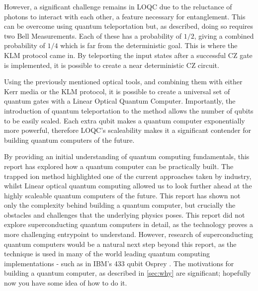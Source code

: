 However, a significant challenge remains in LOQC due to the reluctance of photons to interact with each other, a feature necessary for entanglement. This can be overcome using quantum teleportation but, as described, doing so requires two Bell Measurements. Each of these has a probability of $1/2$, giving a combined probability of $1/4$ which is far from the deterministic goal. This is where the KLM protocol came in. By teleporting the input states after a successful CZ gate is implemented, it is possible to create a near deterministic CZ circuit.

Using the previously mentioned optical tools, and combining them with either Kerr media or the KLM protocol, it is possible to create a universal set of quantum gates with a Linear Optical Quantum Computer. Importantly, the introduction of quantum teleportation to the method allows the number of qubits to be easily scaled. Each extra qubit makes a quantum computer exponentially more powerful, therefore LOQC's scaleability makes it a significant contender for building quantum computers of the future.

By providing an initial understanding of quantum computing fundamentals, this report has explored how a quantum computer can be practically built. The trapped ion method highlighted one of the current approaches  taken by industry, whilst Linear optical quantum computing allowed us to look further ahead at the highly scaleable quantum computers of the future. This report has shown not only the complexity behind building a quantum computer, but crucially the obstacles and challenges that the underlying physics poses. This report did not explore superconducting quantum computers in detail, as the technology proves a more challenging entrypoint to understand. However, research of superconducting quantum computers would be a natural next step beyond this report, as the technique is used in many of the world leading quantum computing implementations - such as in IBM's 433 qubit Osprey \cite{irving_ibm_2022}. The motivations for building a quantum computer, as described in \cref{sec:why} are significant; hopefully now you have some idea of how to do it.